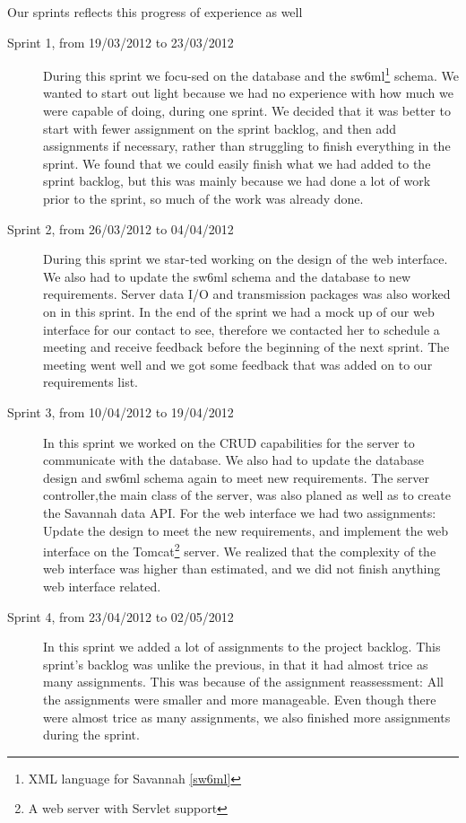 Our sprints reflects this progress of experience as well

\begin{description}
\item [Sprint 1, from 19/03/2012 to 23/03/2012]
	During this sprint we focu-sed on the database and the sw6ml\footnote{XML language for Savannah \autoref{sw6ml}} schema. We wanted to start out light because we had no experience with how much we were capable of doing, during one sprint. We decided that it was better to start with fewer assignment on the sprint backlog, and then add assignments if necessary, rather than struggling to finish everything in the sprint. We found that we could easily finish what we had added to the sprint backlog, but this was mainly because we had done a lot of work prior to the sprint, so much of the work was already done.
\item[Sprint 2, from 26/03/2012 to 04/04/2012]
	During this sprint we star-ted working on the design of the web interface. We also had to update the sw6ml schema and the database to new requirements. Server data I/O and transmission packages was also worked on in this sprint. In the end of the sprint we had a mock up of our web interface for our contact to see, therefore we contacted her to schedule a meeting and receive feedback before the beginning of the next sprint. The meeting went well and we got some feedback that was added on to our requirements list. 
\item[Sprint 3, from 10/04/2012 to 19/04/2012]
	In this sprint we worked on the CRUD capabilities for the server to communicate with the database. We also had to update the database design and sw6ml schema again to meet new requirements. The server controller,the main class of the server, was also planed as well as to create the Savannah data API. For the web interface we had two assignments: Update the design to meet the new requirements, and implement the web interface on the Tomcat\footnote{A web server with Servlet support} server. We realized that the complexity of the web interface was higher than estimated, and we did not finish anything web interface related.
\item [Sprint 4, from 23/04/2012 to 02/05/2012]
	In this sprint we added a lot of assignments to the project backlog. This sprint's backlog was unlike the previous, in that it had almost trice as many assignments. This was because of the assignment reassessment: All the assignments were smaller and more manageable. Even though there were almost trice as many assignments, we also finished more assignments during the sprint.

\end{description}
